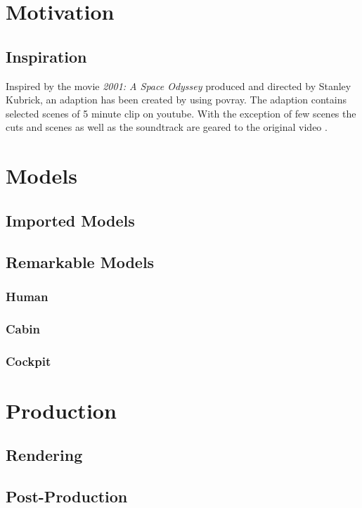 
\chapter{Motivation}
\section{Inspiration}
Inspired by the movie \textit{2001: A Space Odyssey} produced and directed by Stanley Kubrick, an adaption has been created by using povray. The adaption contains selected scenes of 5 minute clip on youtube.  With the exception of few scenes the cuts and scenes as well as the soundtrack are geared to the original video  \cite{EbClectic}.

\chapter{Models}
\section{Imported Models}
\section{Remarkable Models}
\subsection{Human}
\subsection{Cabin}
\subsection{Cockpit}

\chapter{Production}
\section{Rendering}
\section{Post-Production}